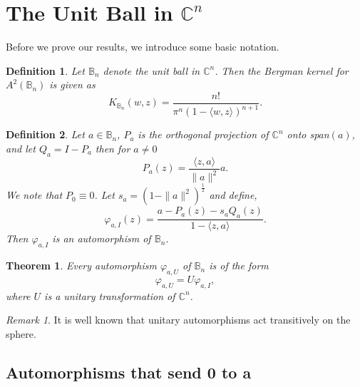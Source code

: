 \documentclass{amsart}
\newtheorem{theorem}{Theorem}
\newtheorem{definition}{Definition}
\theoremstyle{remark}
\newtheorem{remark}{Remark}
\newcommand{\C}{\mathbb{C}}
\newcommand{\B}{\mathbb{B}}
\begin{document}
\section{\texorpdfstring{The Unit Ball in $\mathbb{C}^n$}{The Unit Ball in ℂⁿ}}
Before we prove our results, we introduce some basic notation. 
\begin{definition}
    Let $\B_{n}$ denote the unit ball in $\C^{n}$. Then the Bergman kernel for $A^{2}(\B_{n})$ is given as
    \begin{equation*}
        K_{\B_{n}}(w,z) = \frac{n!}{\pi^{n}(1-\langle w,z \rangle)^{n+1}}.
    \end{equation*}
\end{definition}
\begin{definition}
    \label{1}
    Let $a \in \B_{n}$, $P_{a}$ is the orthogonal projection of $\C^{n}$ onto span$(a)$, and let $Q_{a} = I - P_{a}$ then for $a \neq 0$
    \begin{equation*}
        P_{a}(z) = \frac{\langle z,a \rangle}{\|a\|^{2}}a.
    \end{equation*}
We note that $P_{0} \equiv 0$. Let $s_{a} = (1 - \|a\|^{2})^{\frac{1}{2}}$ and define,
    \begin{equation*}
        \varphi_{a,I}(z) = \frac{a - P_{a}(z) - s_{a}Q_{a}(z)}{1 - \langle z,a \rangle }.
    \end{equation*}
    Then $\varphi_{a,I}$ is an automorphism of $\B_{n}$.
\end{definition}
\begin{theorem}\cite{Rudin80}
Every automorphism $\varphi_{a,U}$ of $\mathbb{B}_n$ is of the form 
\[\varphi_{a,U}=U\varphi_{a,I},\]
where $U$ is a unitary transformation of $\mathbb{C}^n$.
\end{theorem}
\begin{remark}\label{remarkunitary}
It is well known that unitary automorphisms act transitively on the sphere.
\end{remark}
\subsection{Automorphisms that send 0 to a} \mbox{} \\
\end{document}

